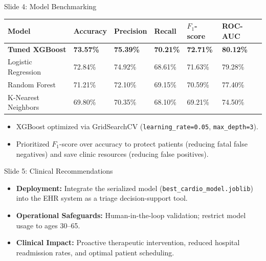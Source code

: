 \documentclass{beamer}
\begin{document}
\begin{frame}{Slide 4: Model Benchmarking}
    \begin{table}
        \begin{tabular}{llllll}
            \hline
            Model & Accuracy & Precision & Recall & $F_1$-score & ROC-AUC \\
            \hline
            \textbf{Tuned XGBoost} & \textbf{73.57\%} & \textbf{75.39\%} & \textbf{70.21\%} & \textbf{72.71\%} & \textbf{80.12\%} \\
            Logistic Regression & 72.84\% & 74.92\% & 68.61\% & 71.63\% & 79.28\% \\
            Random Forest & 71.21\% & 72.10\% & 69.15\% & 70.59\% & 77.40\% \\
            K-Nearest Neighbors & 69.80\% & 70.35\% & 68.10\% & 69.21\% & 74.50\% \\
            \hline
        \end{tabular}
    \end{table}
    \begin{itemize}
        \item XGBoost optimized via GridSearchCV (\texttt{learning\_rate=0.05}, \texttt{max\_depth=3}).
        \item Prioritized $F_1$-score over accuracy to protect patients (reducing fatal false negatives) and save clinic resources (reducing false positives).
    \end{itemize}
\end{frame}

\begin{frame}{Slide 5: Clinical Recommendations}
    \begin{itemize}
        \item \textbf{Deployment:} Integrate the serialized model (\texttt{best\_cardio\_model.joblib}) into the EHR system as a triage decision-support tool.
        \item \textbf{Operational Safeguards:} Human-in-the-loop validation; restrict model usage to ages 30--65.
        \item \textbf{Clinical Impact:} Proactive therapeutic intervention, reduced hospital readmission rates, and optimal patient scheduling.
    \end{itemize}
\end{frame}
\end{document}
